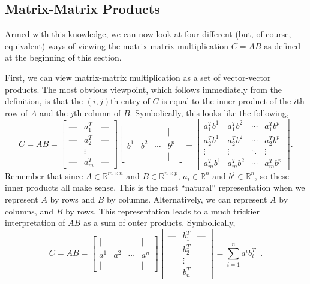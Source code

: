 \documentclass[12pt]{article}
\begin{document}
\subsection{Matrix-Matrix Products}\label{subsec:matrix-matrix}

Armed with this knowledge, we can now look at four different (but, of
course, equivalent) ways of
viewing the matrix-matrix multiplication $C = AB$ as defined at the
beginning of this section.  

First, we can view matrix-matrix
multiplication as a set of vector-vector products.  The most obvious
viewpoint, which follows 
immediately from the definition, is that the $(i,j)$th entry of $C$ is
equal to the inner product of the $i$th row of $A$ and the $j$th column
of $B$.  Symbolically, this looks like the following,
\[C = AB = \left [ \begin{array}{ccc} \mbox{---} & a^T_1 & 
  \mbox{---} \\   \mbox{---} & a^T_2 &  \mbox{---} \\ & \vdots & \\
  \mbox{---} & a^T_m  &  \mbox{---} \end{array} \right ] \left [
  \begin{array}{cccc} | & | &  & | \\ b^1 & b^2 & \cdots & b^p \\ | &
  | &  & | \end{array} \right ] = \left [ \begin{array}{cccc}a^T_1 b^1
    & a^T_1 b^2 & \cdots & a^T_1 b^p \\ a^T_2 b^1 & a^T_2 b^2 & \cdots &
    a^T_2 b^p \\ \vdots & \vdots & \ddots & \vdots \\ a^T_m b^1 &
    a^T_m b^2 & \cdots & a^T_m b^p \end{array} \right ]. \]
Remember that since $A \in \mathbb{R}^{m \times n}$ and $B \in
\mathbb{R}^{n \times p}$, $a_i \in \mathbb{R}^n$ and $b^j \in
\mathbb{R}^n$, so these inner products all make sense. This is the
most ``natural'' representation when we represent $A$ by 
rows and $B$ by columns.  
Alternatively, we can represent $A$ by
columns, and $B$ by rows.  This representation leads to a much trickier interpretation of $AB$ as
a sum of outer products.  Symbolically,
\[C = AB = \left [ \begin{array}{cccc} | & | &  & | \\ a^1 & a^2 &
    \cdots & a^n \\ | & | &  & | \end{array} \right ] \left [
  \begin{array}{ccc} \mbox{---} & b^T_1 & \mbox{---} \\   \mbox{---} &
    b^T_2 &  \mbox{---} \\ & \vdots & \\ \mbox{---} & b^T_n  &
    \mbox{---} \end{array} \right ] = \sum_{i=1}^n a^i
    b_i^T \;\;.\]
\end{document}
